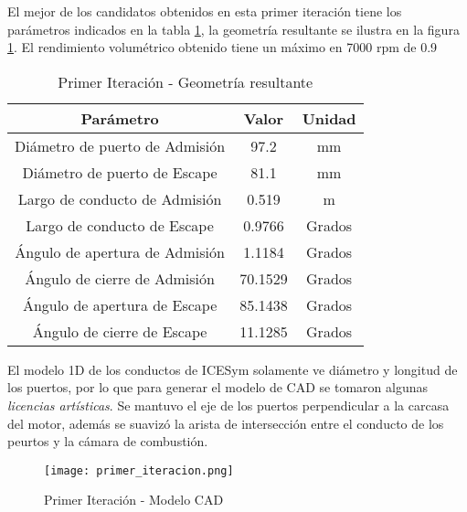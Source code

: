El mejor de los candidatos obtenidos en esta primer iteración tiene los
parámetros indicados en la tabla \ref{tab:primer_it}, la geometría resultante se
ilustra en la figura \ref{fig:primer_it}.
%
El rendimiento volumétrico obtenido tiene un máximo en 7000 rpm de 0.9
%
\begin{table}
    \centering
    \begin{tabular}{ccc}
      \toprule
      Parámetro & Valor & Unidad\\
      \midrule
      Diámetro de puerto de Admisión & 97.2    & mm\\
      Diámetro de puerto de Escape   & 81.1    & mm \\
      Largo de conducto de Admisión  & 0.519   & m\\
      Largo de conducto de Escape    & 0.9766  & Grados\\
      Ángulo de apertura de Admisión & 1.1184  & Grados\\
      Ángulo de cierre de Admisión   & 70.1529 & Grados\\
      Ángulo de apertura de Escape   & 85.1438 & Grados\\
      Ángulo de cierre de Escape     & 11.1285 & Grados\\ \bottomrule
    \end{tabular}
    \caption{Primer Iteración - Geometría resultante}
    \label{tab:primer_it}
\end{table}

El modelo 1D de los conductos de ICESym solamente ve diámetro y longitud  de los
puertos, por lo que para generar el modelo de CAD se tomaron algunas
\emph{licencias artísticas}.
%
Se mantuvo el eje de los puertos perpendicular a la carcasa del motor, además se
suavizó la arista de intersección entre el conducto de los peurtos y la cámara
de combustión.

\begin{figure}
  \centering
  \texttt{[image: primer\_iteracion.png]}
  \caption{Primer Iteración - Modelo CAD}
  \label{fig:primer_it}
\end{figure}
